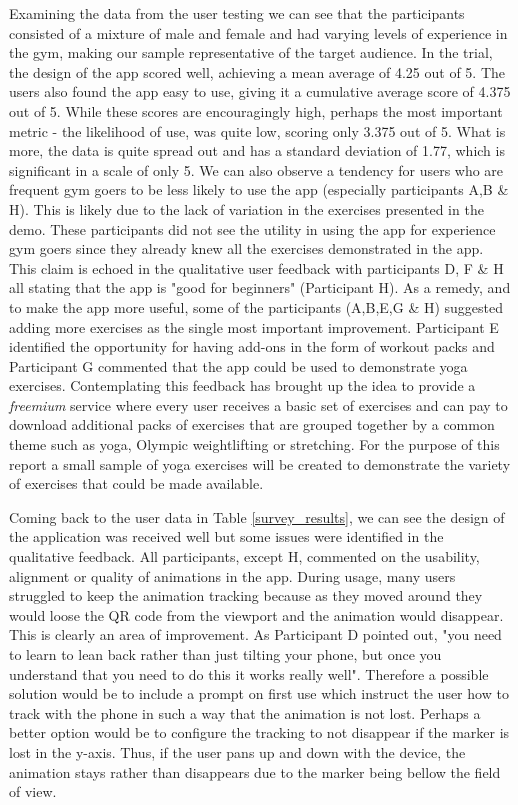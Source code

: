 \documentclass{l4proj}
\begin{document}
Examining the data from the user testing we can see that the participants consisted of a mixture of male and female and had varying levels of experience in the gym, making our sample representative of the target audience. In the trial, the design of the app scored well, achieving a mean average of 4.25 out of 5. The users also found the app easy to use, giving it a cumulative average score of 4.375 out of 5. While these scores are encouragingly high, perhaps the most important metric - the likelihood of use, was quite low, scoring only 3.375 out of 5. What is more, the data is quite spread out and has a standard deviation of 1.77, which is significant in a scale of only 5. We can also observe a tendency for users who are frequent gym goers to be less likely to use the app (especially participants A,B \& H). This is likely due to the lack of variation in the exercises presented in the demo. These participants did not see the utility in using the app for experience gym goers since they already knew all the exercises demonstrated in the app. This claim is echoed in the qualitative user feedback with participants D, F \& H all stating that the app is "good for beginners" (Participant H). As a remedy, and to make the app more useful, some of the participants (A,B,E,G \& H) suggested adding more exercises as the single most important improvement. Participant E identified the opportunity for having add-ons in the form of workout packs and Participant G commented that the app could be used to demonstrate yoga exercises. Contemplating this feedback has brought up the idea to provide a \textit{freemium} service where every user receives a basic set of exercises and can pay to download additional packs of exercises that are grouped together by a common theme such as yoga, Olympic weightlifting or stretching. For the purpose of this report a small sample of yoga exercises will be created to demonstrate the variety of exercises that could be made available. 

Coming back to the user data in Table \ref{survey_results}, we can see the design of the application was received well but some issues were identified in the qualitative feedback. All participants, except H, commented on the usability, alignment or quality of animations in the app. During usage, many users struggled to keep the animation tracking because as they moved around they would loose the QR code from the viewport and the animation would disappear. This is clearly an area of improvement. As Participant D pointed out, "you need to learn to lean back rather than just tilting your phone, but once you understand that you need to do this it works really well". Therefore a possible solution would be to include a prompt on first use which instruct the user how to track with the phone in such a way that the animation is not lost. Perhaps a better option would be to configure the tracking to not disappear if the marker is lost in the y-axis. Thus, if the user pans up and down with the device, the animation stays rather than disappears due to the marker being bellow the field of view. 
\end{document}
